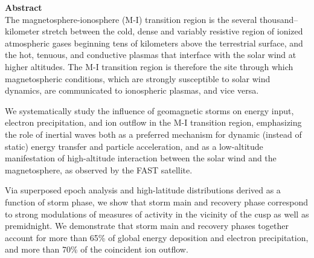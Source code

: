 
\vspace*{1in}
{\Huge \bf Abstract} \\

The magnetosphere-ionosphere (M-I) transition region is the several
thousand--kilometer stretch between the cold, dense and variably
resistive region of ionized atmospheric gases beginning tens of
kilometers above the terrestrial surface, and the hot, tenuous, and
conductive plasmas that interface with the solar wind at higher
altitudes. The M-I transition region is therefore the site through
which magnetospheric conditions, which are strongly susceptible to
solar wind dynamics, are communicated to ionospheric plasmas, and vice
versa.

We systematically study the influence of geomagnetic storms on energy
input, electron precipitation, and ion outflow in the M-I transition
region, emphasizing the role of inertial \Alf waves both as a
preferred mechanism for dynamic (instead of static) energy transfer
and particle acceleration, and as a low-altitude manifestation of
high-altitude interaction between the solar wind and the
magnetosphere, as observed by the FAST satellite.

Via superposed epoch analysis and high-latitude distributions derived
as a function of storm phase, we show that storm main and recovery
phase correspond to strong modulations of measures of \Alfic activity
in the vicinity of the cusp as well as premidnight. We demonstrate
that storm main and recovery phases together account for more than
65\% of global \Alfic energy deposition and electron precipitation,
and more than 70\% of the coincident ion outflow.

